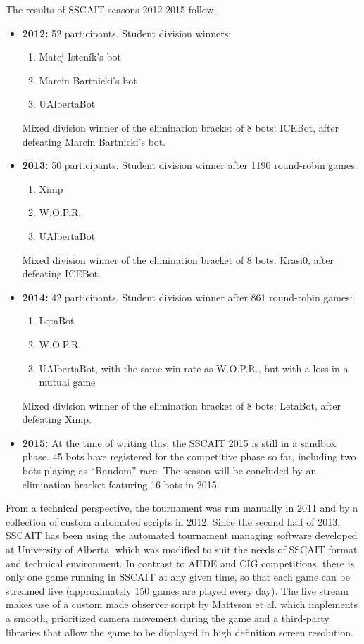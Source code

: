 \documentclass{llncs}
\begin{document}
The results of SSCAIT seasons 2012-2015 follow:
\begin{itemize}
  \item {\bf 2012:} 52 participants. Student division winners: 
  	\begin{enumerate}
  	  \item Matej Isten\'{i}k's bot
  	  \item Marcin Bartnicki's bot
  	  \item UAlbertaBot
  	\end{enumerate}
  Mixed division winner of the elimination bracket of 8 bots: ICEBot, after defeating Marcin Bartnicki's bot. 
  \item {\bf 2013:} 50 participants. Student division winner after 1190 round-robin games: 
    \begin{enumerate}
  	  \item Ximp
  	  \item W.O.P.R.
  	  \item UAlbertaBot
  	\end{enumerate}
  Mixed division winner of the elimination bracket of 8 bots: Krasi0, after defeating ICEBot.
  \item {\bf 2014:} 42 participants. Student division winner after 861 round-robin games: 
    \begin{enumerate}
  	  \item LetaBot
  	  \item W.O.P.R.
  	  \item UAlbertaBot, with the same win rate as W.O.P.R., but with a loss in a mutual game
  	\end{enumerate}
  Mixed division winner of the elimination bracket of 8 bots: LetaBot, after defeating Ximp.
  \item {\bf 2015:} At the time of writing this, the SSCAIT 2015 is still in a sandbox phase. 45 bots have registered for the competitive phase so far, including two bots playing as ``Random'' race. The season will be concluded by an elimination bracket featuring 16 bots in 2015.
\end{itemize}


From a technical perspective, the tournament was run manually in 2011 and by a collection of custom automated scripts in 2012. Since the second half of 2013, SSCAIT has been using the automated tournament managing software developed at University of Alberta, which was modified to suit the needs of SSCAIT format and technical environment. In contrast to AIIDE and CIG competitions, there is only one game running in SSCAIT at any given time, so that each game can be streamed live (approximately 150 games are played every day). The live stream makes use of a custom made observer script by Mattsson et al. \cite{mattsson2015automatic} which implements a smooth, prioritized camera movement during the game and a third-party libraries that allow the game to be displayed in high definition screen resolution. 
\end{document}
